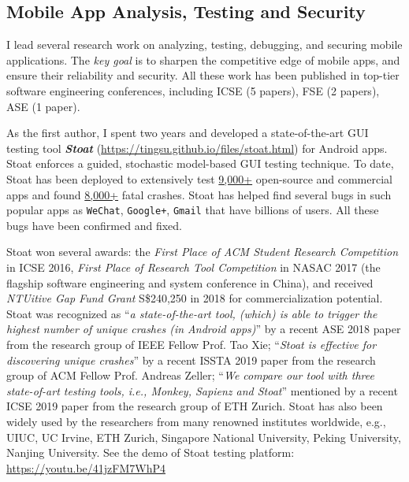 \documentclass[a4paper]{article}
\begin{document}
\subsection{Mobile App Analysis, Testing and Security}
\label{mobile}

I lead several research work on analyzing, testing, debugging, and securing mobile applications. The \emph{key goal} is to sharpen the competitive edge of mobile apps, and ensure their reliability and security.
All these work has been published in top-tier software engineering conferences, including ICSE (5 papers), FSE (2 papers), ASE (1 paper).

As the first author, I spent two years and developed a state-of-the-art GUI testing tool \emph{\textbf{Stoat}} (\url{https://tingsu.github.io/files/stoat.html}) for Android apps.
Stoat enforces a guided, stochastic model-based GUI testing technique.
To date, Stoat has been deployed to extensively test \underline{9,000+} open-source and commercial apps and found \underline{8,000+} fatal crashes. Stoat has helped find several bugs in such popular apps as \texttt{WeChat}, \texttt{Google+}, \texttt{Gmail} that have billions of users. All these bugs have been confirmed and fixed. 

Stoat won several awards: the \emph{First Place of ACM Student Research Competition} in ICSE 2016, \emph{First Place of Research Tool Competition} in NASAC 2017 (the flagship software engineering and system conference in China), and received \emph{NTUitive Gap Fund Grant} S\$240,250 in 2018 for commercialization potential. Stoat was recognized as ``\emph{a state-of-the-art tool, (which) is able to trigger the highest number of unique crashes (in Android apps)}'' by a recent ASE 2018 paper from the research group of IEEE Fellow Prof. Tao Xie; ``\emph{Stoat is effective for discovering unique crashes}'' by a recent ISSTA 2019 paper from the research group of ACM Fellow Prof. Andreas Zeller; ``\emph{We compare our tool with three state-of-art testing tools, i.e., Monkey, Sapienz and Stoat}'' mentioned by a recent ICSE 2019 paper from the research group of ETH Zurich.
Stoat has also been widely used by the researchers from many renowned institutes worldwide, e.g., UIUC, UC Irvine, ETH Zurich, Singapore National University, Peking University, Nanjing University. See the demo of Stoat testing platform: \url{https://youtu.be/41jzFM7WhP4}
\end{document}
